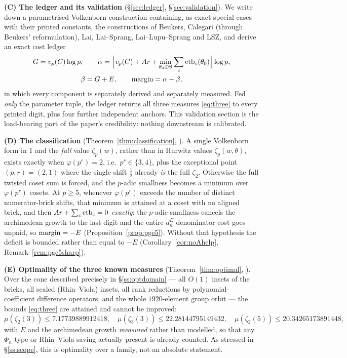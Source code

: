 \smallskip\noindent\textbf{(C) The ledger and its validation} (\S\ref{sec:ledger},
\S\ref{sec:validation}). We write down a parametrised Volkenborn construction containing, as
exact special cases with their printed constants, the constructions of Beukers, Calegari
(through Beukers' reformulation), Lai, Lai--Sprang, Lai--Lupu--Sprang and LSZ, and derive an
exact cost ledger
\[
\begin{gathered}
 G=v_p(C)\log p,\qquad
 \alpha=\Bigl[v_p(C)+Ar+\min_{\theta_0\in\Theta}\sum_c\operatorname{ctb}_c(\theta_0)\Bigr]\log p,\\
 \beta=G+E,\qquad \operatorname{margin}=\alpha-\beta ,
\end{gathered}
\]
in which every component is separately derived and separately measured. Fed \emph{only} the
parameter tuple, the ledger returns all three measures \eqref{eq:three} to every printed
digit, plus four further independent anchors. This validation section is the load-bearing
part of the paper's credibility: nothing downstream is calibrated.

\smallskip\noindent\textbf{(D) The classification} (Theorem~\ref{thm:classification},
\PROVED). A single Volkenborn form in $1$ and the \emph{full} value $\zeta_p(w)$, rather
than in Hurwitz values $\zeta_p(w,\theta)$, exists exactly when $\varphi(p^r)=2$, i.e.\
$p^r\in\{3,4\}$, plus the exceptional point $(p,r)=(2,1)$ where the single shift $\tfrac12$
already \emph{is} the full $\zeta_2$. Otherwise the full twisted coset sum is forced, and
the $p$-adic smallness becomes a minimum over $\varphi(p^r)$ cosets. At $p\ge5$, whenever
$\varphi(p^r)$ exceeds the number of distinct numerator-brick shifts, that
minimum is attained at a coset with no aligned brick, and then
$Ar+\sum_c\operatorname{ctb}_c=0$ \emph{exactly}: the $p$-adic smallness cancels the archimedean growth
to the last digit and the entire $d_n^E$ denominator cost goes unpaid, so $\operatorname{margin}=-E$
(Proposition~\ref{prop:pge5}). Without that hypothesis the deficit is bounded rather than
equal to $-E$ (Corollary~\ref{cor:noAhelp}, Remark~\ref{rem:pge5sharp}).

\smallskip\noindent\textbf{(E) Optimality of the three known measures}
(Theorem~\ref{thm:optimal}, \COMP{stated cone}). Over the cone described precisely in
\S\ref{ss:optdomain} --- all $O(1)$ insets of the bricks, all scaled (Rhin--Viola) insets,
all rank reductions by polynomial-coefficient difference operators, and the whole
$1920$-element group orbit --- the bounds \eqref{eq:three} are attained and cannot be
improved:
\[
 \mu(\zeta_2(3))\le7.17739889912418,\quad
 \mu(\zeta_3(3))\le22.28144795149432,\quad
 \mu(\zeta_2(5))\le20.34265173891448,
\]
with $E$ and the archimedean growth \emph{measured} rather than modelled, so that any
$\Phi_n$-type or Rhin--Viola saving actually present is already counted. As stressed in
\S\ref{ss:scope}, this is optimality over a family, not an absolute statement.

